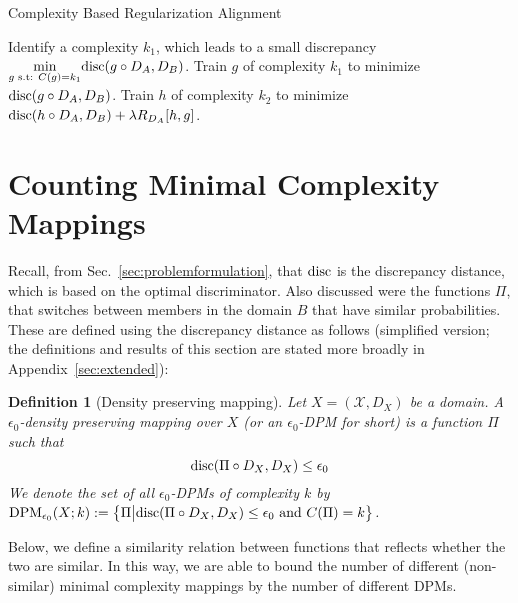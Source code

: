 \documentclass{article} %
\newtheorem{defn}{Definition}
\newcommand{\disc}{\textnormal{disc}}
\begin{document}
\begin{algorithm}
\caption{Complexity Based Regularization Alignment
\label{algo:duallayers}}
\begin{algorithmic}[1]
		\State Identify a complexity $k_1$, which leads to a small discrepancy $\underset{g \textnormal{ s.t: } C(g)=k_1}{\min} \disc(g \circ D_A,D_B)$. 
        \State Train $g$ of complexity $k_1$ to minimize $\disc(g \circ D_A,D_B)$.
        \State Train $h$ of complexity $k_2$ to minimize $\disc(h \circ D_A,D_B) + \lambda R_{D_A}[h,g]$.
\end{algorithmic}
\end{algorithm}

 
\section{Counting Minimal Complexity Mappings}
\label{sec:counting}

Recall, from Sec.~\ref{sec:problemformulation}, that $\disc$ is the discrepancy distance, which is based on the optimal discriminator. Also discussed were the functions $\Pi$, that switches between members in the domain $B$ that have similar probabilities. These are defined using the discrepancy distance as follows (simplified version; the definitions and results of this section are stated more broadly in Appendix~\ref{sec:extended}):

\begin{defn}[Density preserving mapping]\label{def:DPMinformal} Let $X=(\mathcal{X},D_X)$ be a domain. A $\epsilon_0$-density preserving mapping over $X$ (or an $\epsilon_0$-DPM for short) is a function $\Pi$ such that 
\begin{equation}
\disc(\Pi \circ D_X,D_X) \leq \epsilon_0
\end{equation}
We denote the set of all $\epsilon_0$-DPMs of complexity $k$ by $\textnormal{DPM}_{\epsilon_0}(X;k):=\left\{\Pi \big\vert \disc(\Pi \circ D_X,D_X) \leq \epsilon_0
 \textnormal{ and } C(\Pi)=k \right\}$. 
\end{defn}

Below, we define a similarity relation between functions that reflects whether the two are similar. In this way, we are able to bound the number of different (non-similar) minimal complexity mappings by the number of different DPMs. 
\end{document}
